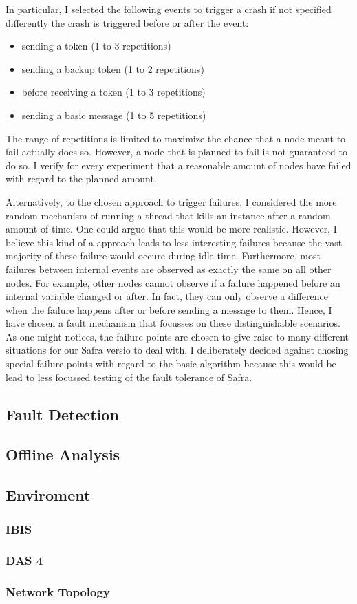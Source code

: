 	In particular, I selected the following events to trigger a crash if not specified differently the crash is triggered before or after the event:
	\begin{itemize}
	   	\item sending a token (1 to 3 repetitions)
	   	\item sending a backup token (1 to 2 repetitions)
	   	\item before receiving a token (1 to 3 repetitions)
	   	\item sending a basic message (1 to 5 repetitions)
	\end{itemize}
	The range of repetitions is limited to maximize the chance that a node meant to fail actually does so. 
	However, a node that is planned to fail is not guaranteed to do so.
	I verify for every experiment that a reasonable amount of nodes have failed with regard to the planned amount.
	
	Alternatively, to the chosen approach to trigger failures, I considered the more random mechanism of running a thread that kills an instance after a random amount of time.
	One could argue that this would be more realistic.
	However, I believe this kind of a approach leads to less interesting failures because the vast majority of these failure would occure during idle time. 
	Furthermore, most failures between internal events are observed as exactly the same on all other nodes. 
	For example, other nodes cannot observe if a failure happened before an internal variable changed or after. 
	In fact, they can only observe a difference when the failure happens after or before sending a message to them.
	Hence, I have chosen a fault mechanism that focusses on these distinguishable scenarios.
	As one might notices, the failure points are chosen to give raise to many different situations for our Safra versio to deal with. 
	I deliberately decided against chosing special failure points with regard to the basic algorithm because this would be lead to less focussed testing of the fault tolerance of Safra.

\subsection{Fault Detection}
\subsection{Offline Analysis}

\subsection{Enviroment}
\subsubsection{IBIS}
\subsubsection{DAS 4}
\subsubsection{Network Topology}